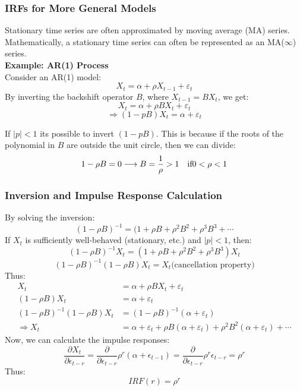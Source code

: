     
\subsubsection{IRFs for More General Models}

Stationary time series are often approximated by moving average (MA) series. Mathematically, a stationary time series can often be represented as an MA($\infty$) series. \\

\textbf{Example: AR(1) Process}\\

Consider an AR(1) model:
    \[
    X_t = \alpha + \rho X_{t-1}+\varepsilon_t
    \]
By inverting the backshift operator $B$, where $X_{t-1} = BX_t$, we get: 
       \[
        X_t= \alpha+\rho BX_t +\varepsilon_t
        \]\[
        \Rightarrow (1-pB)X_t=\alpha+\varepsilon_t
        \]

If $|p|<1$ its possible to invert $(1-pB)$. This is because if the roots of the polynomial in $B$ are outside the unit circle, then we can divide: 
\[
1-\rho B = 0 \longrightarrow B = \frac{1}{\rho} > 1 \text{\quad if} 0<\rho<1
\]

\subsubsection{Inversion and Impulse Response Calculation}

By solving the inversion: \[
(1-\rho B)^{-1}= (1+\rho B + \rho^2 B^2 + \rho^3 B^3 + \cdots
\]
If $X_t$ is sufficiently well-behaved (stationary, etc.) and $|p|<1$, then: 
\[
(1-\rho B)^{-1}X_t= (1+\rho B + \rho^2 B^2 + \rho^3 B^3)X_t
\]\[
(1-\rho B)^{-1} (1-\rho B) X_t = X_t \text{(cancellation property)}\]
Thus: 
\begin{align*}
    X_t &= \alpha+ \rho B X_t + \varepsilon_t\\
    (1-\rho B) X_t &= \alpha + \varepsilon_t \\
    (1-\rho B)^{-1}(1-\rho B) X_t &= (1-\rho B)^{-1} (\alpha + \varepsilon_t)\\
    \Rightarrow X_t &= \alpha + \varepsilon_t + \rho B(\alpha + \varepsilon_t)+ \rho^2 B^2(\alpha+\varepsilon_t) + \cdots
\end{align*}
Now, we can calculate the impulse responses: 
\[
\frac{\partial X_t}{\partial \epsilon_{t-r}}= \frac{\partial}{\partial \epsilon_{t-r}}\rho^r (\alpha + \epsilon_{t-1} )= \frac{\partial}{\partial \epsilon_{t-r}}\rho^r \epsilon_{t-r} = \rho^r
\]
Thus: \[
IRF(r) = \rho^r
\]

